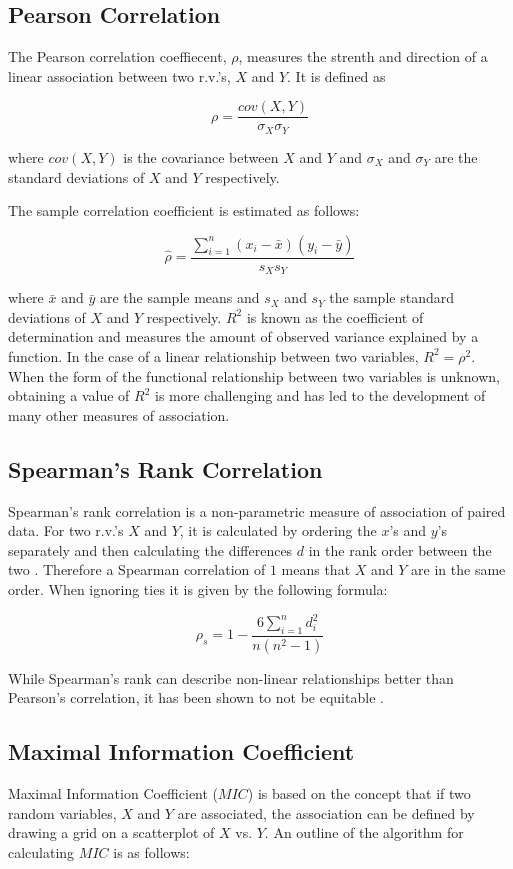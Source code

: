\documentclass[a4paper, 12pt]{report}
\begin{document}
\subsection*{Pearson Correlation}
The Pearson correlation coeffiecent, $\rho$, measures the strenth and direction of a linear association between two r.v.'s, $X$ and $Y$. It is defined as

\[
\rho = \frac{cov(X,Y)}{\sigma_X \sigma_Y}
\]

where $cov(X,Y)$ is the covariance between $X$ and $Y$ and $\sigma_X$ and $\sigma_Y$ are the standard deviations of $X$ and $Y$ respectively.

The sample correlation coefficient is estimated as follows:

\[
\hat{\rho} = \frac{\sum_{i=1}^n(x_i - \bar{x})(y_i - \bar{y})}{s_X s_Y}
\]

where $\bar{x}$ and $\bar{y}$ are the sample means and $s_X$ and $s_Y$ the sample standard deviations of $X$ and $Y$ respectively. $R^2$  is known as the coefficient of determination and measures the amount of observed variance explained by a function. In the case of a linear relationship between two variables, $R^2 = \rho^2$. When the form of the functional relationship between two variables is unknown, obtaining a value of $R^2$ is more challenging \cite{Murrel:2013:Online} and has led to the development of many other measures of association.

\subsection*{Spearman's Rank Correlation}
Spearman's rank correlation is a non-parametric measure of association of paired data. For two r.v.'s $X$ and $Y$, it is calculated by ordering the $x$'s and $y$'s separately and then calculating the differences $d$ in the rank order between the two \cite{MSA}. Therefore a Spearman correlation of $1$ means that $X$ and $Y$ are in the same order. When ignoring ties it is given by the following formula:

\[
\rho_s = 1-\frac{6 \sum_{i=1}^n d_i^2}{n(n^2-1)}
\]

While Spearman's rank can describe non-linear relationships better than Pearson's correlation, it has been shown to not be equitable \cite{mic2011}.


\subsection*{Maximal Information Coefficient}
Maximal Information Coefficient ($MIC$) is based on the concept that if two random variables, $X$ and $Y$ are associated, the association can be defined by drawing a grid on a scatterplot of $X$ vs. $Y$. An outline of the algorithm for calculating $MIC$ is as follows:
\end{document}
